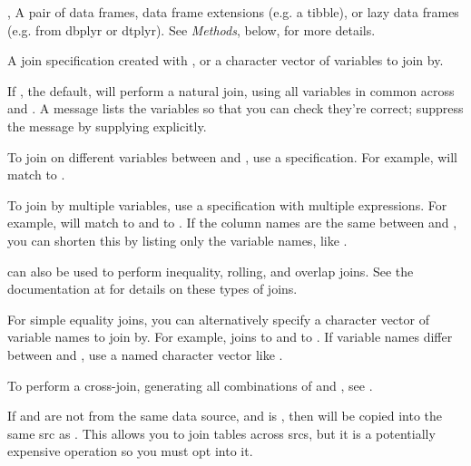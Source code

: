 \documentclass[a4paper]{book}
\begin{document}
\begin{Arguments}
\begin{ldescription}
\item[\code{x}, \code{y}] A pair of data frames, data frame extensions (e.g. a tibble), or
lazy data frames (e.g. from dbplyr or dtplyr). See \emph{Methods}, below, for
more details.

\item[\code{by}] A join specification created with , or a character
vector of variables to join by.

If , the default,  will perform a natural join, using all
variables in common across  and . A message lists the variables so
that you can check they're correct; suppress the message by supplying 
explicitly.

To join on different variables between  and , use a 
specification. For example,  will match  to .

To join by multiple variables, use a  specification with
multiple expressions. For example,  will match
 to  and  to . If the column names are the same between
 and , you can shorten this by listing only the variable names, like
.

 can also be used to perform inequality, rolling, and overlap
joins. See the documentation at  for details on
these types of joins.

For simple equality joins, you can alternatively specify a character vector
of variable names to join by. For example,  joins 
to  and  to . If variable names differ between  and ,
use a named character vector like .

To perform a cross-join, generating all combinations of  and , see
.

\item[\code{copy}] If  and  are not from the same data source,
and  is , then  will be copied into the
same src as .  This allows you to join tables across srcs, but
it is a potentially expensive operation so you must opt into it.


\end{ldescription}
\end{Arguments}
\end{document}
